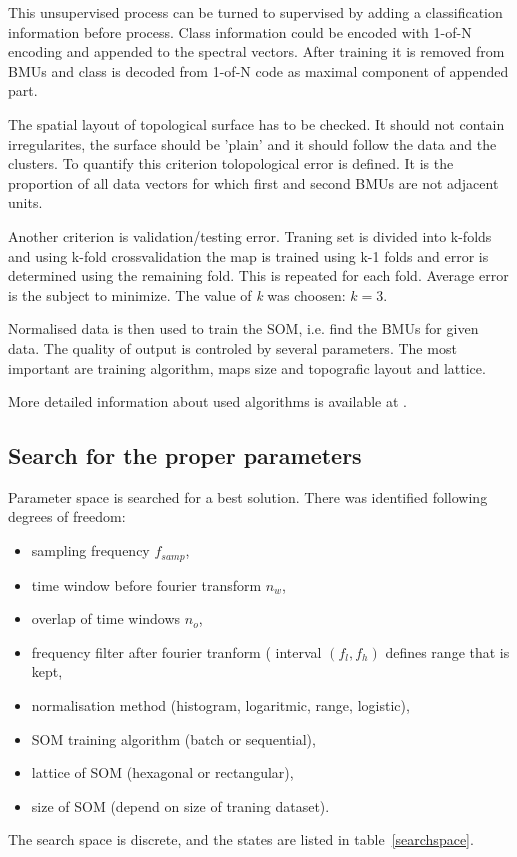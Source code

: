 \documentclass[a4paper]{IEEEtran}
\begin{document}
This unsupervised process can be turned to supervised by adding a classification
information before process.
Class information  could be encoded with 1-of-N encoding and appended to the 
spectral vectors. After training it is removed from BMUs and class is 
decoded from 1-of-N code as maximal component of appended part.

The spatial 
layout of topological surface has to be checked. It should not contain irregularites, 
the surface should be 'plain' and it should follow the data and the clusters.
To quantify this criterion tolopological error is defined. It is the proportion 
of all data vectors for which first and second BMUs are not adjacent units.

Another criterion is validation/testing error. Traning set is divided into k-folds
and using k-fold crossvalidation the map is trained using k-1 folds and  error 
is determined using the remaining fold. This is repeated for each fold. Average error is 
the subject to minimize. The value of \textit{k} was choosen: $ k = 3 $.

Normalised data is then used to train the SOM, i.e. find the BMUs for given data.
The quality of output is controled by several parameters. The most important are 
training algorithm, maps size and topografic layout and lattice.

More detailed information about used algorithms is available at \cite{somtoolbox}.

\subsection{Search for the proper parameters}
Parameter space is searched for a best solution. There was identified
following degrees of freedom:
\begin{itemize}
	\item sampling frequency $ f_{samp} $,
	\item time window before fourier transform $ n_w $,
	\item overlap of time windows $ n_o $,
	\item frequency filter after fourier tranform ( interval $ (f_l, f_h) $ defines 
	range that is kept,
	\item normalisation method (histogram, logaritmic, range, logistic),
	\item SOM training algorithm (batch or sequential),
	\item lattice of SOM (hexagonal or rectangular),
	\item size of SOM (depend on size of traning dataset).
\end{itemize}
The search space is discrete, and the states are
listed  in table~\ref{searchspace}.
\end{document}
